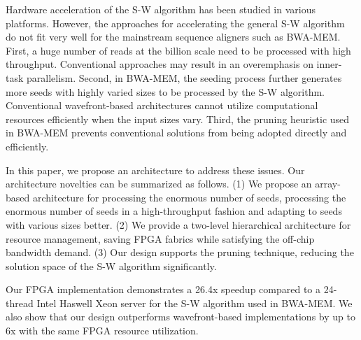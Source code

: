 
Hardware acceleration of the S-W algorithm has been studied in various platforms. 
However, the approaches for accelerating the general S-W algorithm do not fit very well for the mainstream sequence aligners such as BWA-MEM. 
First, a huge number of reads at the billion scale need to be processed with high throughput. 
Conventional approaches may result in an overemphasis on inner-task parallelism. 
Second, in BWA-MEM, the seeding process further generates more seeds with highly varied sizes to be processed by the S-W algorithm. 
Conventional wavefront-based architectures cannot utilize computational resources efficiently when the input sizes vary. 
Third, the pruning heuristic used in BWA-MEM prevents conventional solutions from being adopted directly and efficiently.

In this paper, we propose an architecture to address these issues.
Our architecture novelties can be summarized as follows.
(1) We propose an array-based architecture for processing the enormous number of seeds, processing the enormous number of seeds in a high-throughput fashion and adapting to seeds with various sizes better.
(2) We provide a two-level hierarchical architecture for resource management, saving FPGA fabrics while satisfying the off-chip bandwidth demand.
(3) Our design supports the pruning technique, reducing the solution space of the S-W algorithm significantly. 

Our FPGA implementation demonstrates a 26.4x speedup compared to a 24-thread Intel Haswell Xeon server for the S-W algorithm used in BWA-MEM.
We also show that our design outperforms wavefront-based implementations by up to 6x with the same FPGA resource utilization.
